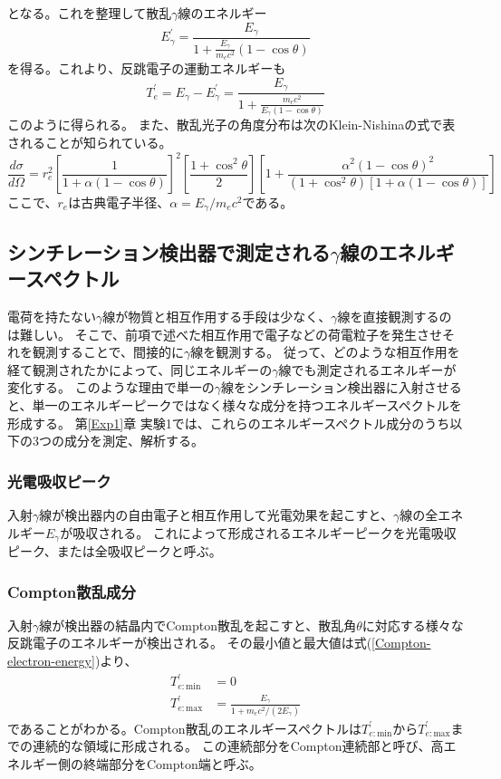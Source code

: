 \documentclass[11pt, titlepage, openany]{ltjsbook}
\begin{document}
となる。これを整理して散乱$\gamma$線のエネルギー
\begin{equation}
    E^{\prime}_{\gamma} = \frac{E_{\gamma}}{1 + \frac{E_{\gamma}}{m_e c^2}(1 - \cos\theta)}
    \label{Compton-gamma-energy}
\end{equation}
を得る。これより、反跳電子の運動エネルギーも
\begin{equation}
    T^{\prime}_{e} = E_{\gamma} - E^{\prime}_{\gamma} = \frac{E_{\gamma}}{1 + \frac{m_e c^2}{E_{\gamma} (1 - \cos\theta)}}
    \label{Compton-electron-energy}
\end{equation}
このように得られる。
また、散乱光子の角度分布は次のKlein-Nishinaの式で表されることが知られている。
\begin{equation}
    \frac{d\sigma}{d\Omega} = r_e^2 \left[ \frac{1}{1 + \alpha (1 - \cos\theta)} \right]^2 \left[ \frac{1 + \cos^2 \theta}{2} \right]
    \left[ 1 + \frac{\alpha^2 (1 - \cos\theta)^2}{(1 + \cos^2\theta)[1 + \alpha(1 - \cos\theta)]} \right]
    \label{klein-nishina}
\end{equation}
ここで、$r_e$は古典電子半径、$\alpha=E_{\gamma}/m_e c^2$である。
\subsection{シンチレーション検出器で測定される$\gamma$線のエネルギースペクトル}
電荷を持たない$\gamma$線が物質と相互作用する手段は少なく、$\gamma$線を直接観測するのは難しい。
そこで、前項で述べた相互作用で電子などの荷電粒子を発生させそれを観測することで、間接的に$\gamma$線を観測する。
従って、どのような相互作用を経て観測されたかによって、同じエネルギーの$\gamma$線でも測定されるエネルギーが変化する。
このような理由で単一の$\gamma$線をシンチレーション検出器に入射させると、単一のエネルギーピークではなく様々な成分を持つエネルギースペクトルを形成する。
第\ref{Exp1}章 実験1では、これらのエネルギースペクトル成分のうち以下の3つの成分を測定、解析する。
\subsubsection{光電吸収ピーク}
入射$\gamma$線が検出器内の自由電子と相互作用して光電効果を起こすと、$\gamma$線の全エネルギー$E_{\gamma}$が吸収される。
これによって形成されるエネルギーピークを光電吸収ピーク、または全吸収ピークと呼ぶ。
\subsubsection{Compton散乱成分}
入射$\gamma$線が検出器の結晶内でCompton散乱を起こすと、散乱角$\theta$に対応する様々な反跳電子のエネルギーが検出される。
その最小値と最大値は式(\ref{Compton-electron-energy})より、
\begin{align}
    T^{\prime}_{e:\mathrm{min}} & = 0 \\
    T^{\prime}_{e:\mathrm{max}} & = \frac{E_{\gamma}}{1 + m_e c^2 / (2E_{\gamma})}
    \label{Compton-edge-formula}
\end{align}
であることがわかる。Compton散乱のエネルギースペクトルは$T^{\prime}_{e:\mathrm{min}}$から$T^{\prime}_{e:\mathrm{max}}$までの連続的な領域に形成される。
この連続部分をCompton連続部と呼び、高エネルギー側の終端部分をCompton端と呼ぶ。
\end{document}
